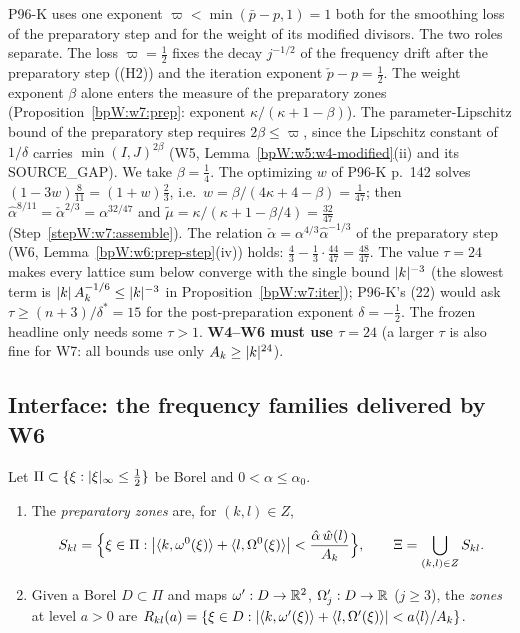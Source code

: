\begin{remark}\label{bpW:w7:choices}
P96-K uses one exponent $\varpi<\min(\bar p-p,1)=1$ both for the smoothing loss of the preparatory step and for the
weight of its modified divisors. The two roles separate. The loss $\varpi=\frac12$ fixes the decay $j^{-1/2}$ of the
frequency drift after the preparatory step ((H2)) and the iteration exponent $\check p-p=\frac12$. The weight exponent
$\beta$ alone enters the measure of the preparatory zones (Proposition~\ref{bpW:w7:prep}: exponent
$\kappa/(\kappa+1-\beta)$). The parameter-Lipschitz bound of the preparatory step requires $2\beta\le\varpi$, since the
Lipschitz constant of $1/\delta$ carries $\min(I,J)^{2\beta}$ (W5, Lemma~\ref{bpW:w5:w4-modified}(ii) and its
\textsf{SOURCE\_GAP}). We take $\beta=\frac14$. The optimizing $w$ of P96-K p.~142 solves
$(1-3w)\frac8{11}=(1+w)\frac23$, i.e.\ $w=\beta/(4\kappa+4-\beta)=\frac1{47}$; then
$\hat\alpha^{8/11}=\check\alpha^{2/3}=\alpha^{32/47}$ and $\tilde\mu=\kappa/(\kappa+1-\beta/4)=\frac{32}{47}$
(Step~\ref{stepW:w7:assemble}). The relation $\check\alpha=\alpha^{4/3}\hat\alpha^{-1/3}$ of the preparatory step
(W6, Lemma~\ref{bpW:w6:prep-step}(iv)) holds: $\frac43-\frac13\cdot\frac{44}{47}=\frac{48}{47}$. The value $\tau=24$ makes every lattice sum below converge with the single bound
$\lvert k\rvert^{-3}$ (the slowest term is $\lvert k\rvert\,A_k^{-1/6}\le\lvert k\rvert^{-3}$ in Proposition~\ref{bpW:w7:iter}); P96-K's
(22) would ask $\tau\ge(n+3)/\delta^*=15$ for the post-preparation exponent $\delta=-\frac12$. The frozen
headline only needs some $\tau>1$. \textbf{W4--W6 must use $\tau=24$} (a larger $\tau$ is also fine for W7: all bounds
use only $A_k\ge\lvert k\rvert^{24}$).
\end{remark}

\subsection{Interface: the frequency families delivered by W6}\label{bpW:w7:interface-sec}

\begin{definition}\label{bpW:w7:zones}
Let $\Pi\subset\{\xi:\lvert \xi\rvert_\infty\le\frac12\}$ be Borel and $0<\alpha\le\alpha_0$.
\begin{enumerate}[label=(\roman*)]
\item The \emph{preparatory zones} are, for $(k,l)\in Z$,
  \[S_{kl}=\Bigl\{\xi\in\Pi:\bigl|\langle k,\omega^0(\xi)\rangle+\langle l,\Omega^0(\xi)\rangle\bigr|<\frac{\hat\alpha\,\hat w(l)}{A_k}\Bigr\},
  \qquad\Xi=\bigcup_{(k,l)\in Z}S_{kl}.\]
\item Given a Borel $D\subset\Pi$ and maps $\omega':D\to\mathbb{R}^2$, $\Omega'_j:D\to\mathbb{R}$ ($j\ge3$), the \emph{zones} at
  level $a>0$ are $R_{kl}(a)=\{\xi\in D:\lvert \langle k,\omega'(\xi)\rangle+\langle l,\Omega'(\xi)\rangle\rvert<a\langle l\rangle/A_k\}$.
\end{enumerate}
\end{definition}

